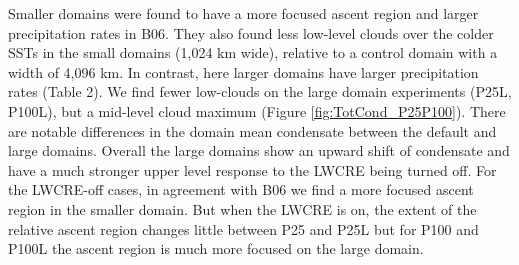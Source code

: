 \documentclass[draft]{agujournal2019}
\begin{document}
Smaller domains were found to have a more focused ascent region and larger precipitation rates in B06.
They also found less low-level clouds over the colder SSTs in the small domains (1,024 km wide), relative 
to a control domain with a width of 4,096 km.   In contrast, here larger domains have larger precipitation rates (Table 2).  
We find fewer low-clouds on the large domain experiments (P25L, P100L), but a mid-level cloud 
maximum (Figure \ref{fig:TotCond_P25P100}).   There are notable differences in the domain mean condensate between 
the default and large domains.  Overall the large domains show an upward shift of condensate and have 
a much stronger upper level response to the LWCRE being turned off.
For the LWCRE-off cases, in agreement with B06 we find a more 
focused ascent region in the smaller domain.   But when the LWCRE is on, the extent of the relative ascent region 
changes little between P25 
and P25L but for P100 and P100L the ascent region is much more focused on the large domain.    



\end{document}

